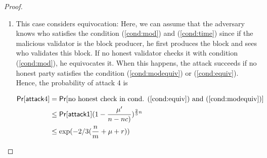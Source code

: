 \begin{proof}
\begin{enumerate}
    
    \item This case considers equivocation: Here, we can assume that the adversary knows who satisfies the condition (\ref{cond:mod}) and (\ref{cond:time}) since if the malicious validator is the block producer, he first produces the block and sees who validates this block. If no honest validator checks it with condition (\ref{cond:mod}), he equivocates it. When this happens, the attack succeeds if no honest party satisfies the condition (\ref{cond:modequiv}) or (\ref{cond:equiv}). Hence,
    the probability of attack 4 is
    
    \begin{align}
    \mathsf{Pr}[\mathsf{attack} 4] &=\mathsf{Pr}[\text{no honest check in  cond. (\ref{cond:equiv}) and (\ref{cond:modequiv})}]\nonumber \\ 
							&\leq \mathsf{Pr}[\mathsf{attack1}](1-\frac{\mu'}{n-nc)}) ^{\frac{2}{3}n} \nonumber\\
				            & \leq \exp({-2/3(\frac{n}{m}+\mu + r)}) \nonumber
    \end{align}
\end{enumerate}	
    
    
    





%




\end{proof}
